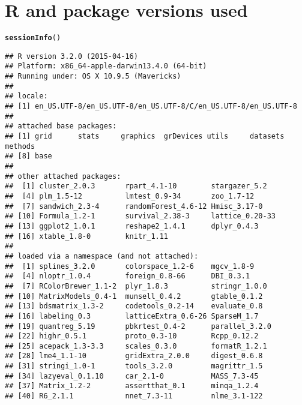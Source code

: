 \documentclass[11pt]{article}\usepackage[]{graphicx}\usepackage[]{color}
\makeatletter
\newcommand{\hlstd}[1]{\textcolor[rgb]{0.345,0.345,0.345}{#1}}%
\newcommand{\hlkwd}[1]{\textcolor[rgb]{0.737,0.353,0.396}{\textbf{#1}}}%
\newenvironment{kframe}{%
 \def\at@end@of@kframe{}%
 \ifinner\ifhmode%
  \def\at@end@of@kframe{\end{minipage}}%
  \begin{minipage}{\columnwidth}%
 \fi\fi%
 \def\FrameCommand##1{\hskip\@totalleftmargin \hskip-\fboxsep
 \colorbox{shadecolor}{##1}\hskip-\fboxsep
     \hskip-\linewidth \hskip-\@totalleftmargin \hskip\columnwidth}%
 \MakeFramed {\advance\hsize-\width
   \@totalleftmargin\z@ \linewidth\hsize
   \@setminipage}}%
 {\par\unskip\endMakeFramed%
 \at@end@of@kframe}
\newenvironment{knitrout}{}{} %
\makeatother
\begin{document}
\clearpage


\section{R and package versions used}
\begin{knitrout}
\color{fgcolor}\begin{kframe}
\begin{alltt}
\hlkwd{sessionInfo}\hlstd{()}
\end{alltt}
\begin{verbatim}
## R version 3.2.0 (2015-04-16)
## Platform: x86_64-apple-darwin13.4.0 (64-bit)
## Running under: OS X 10.9.5 (Mavericks)
## 
## locale:
## [1] en_US.UTF-8/en_US.UTF-8/en_US.UTF-8/C/en_US.UTF-8/en_US.UTF-8
## 
## attached base packages:
## [1] grid      stats     graphics  grDevices utils     datasets  methods  
## [8] base     
## 
## other attached packages:
##  [1] cluster_2.0.3       rpart_4.1-10        stargazer_5.2      
##  [4] plm_1.5-12          lmtest_0.9-34       zoo_1.7-12         
##  [7] sandwich_2.3-4      randomForest_4.6-12 Hmisc_3.17-0       
## [10] Formula_1.2-1       survival_2.38-3     lattice_0.20-33    
## [13] ggplot2_1.0.1       reshape2_1.4.1      dplyr_0.4.3        
## [16] xtable_1.8-0        knitr_1.11         
## 
## loaded via a namespace (and not attached):
##  [1] splines_3.2.0       colorspace_1.2-6    mgcv_1.8-9         
##  [4] nloptr_1.0.4        foreign_0.8-66      DBI_0.3.1          
##  [7] RColorBrewer_1.1-2  plyr_1.8.3          stringr_1.0.0      
## [10] MatrixModels_0.4-1  munsell_0.4.2       gtable_0.1.2       
## [13] bdsmatrix_1.3-2     codetools_0.2-14    evaluate_0.8       
## [16] labeling_0.3        latticeExtra_0.6-26 SparseM_1.7        
## [19] quantreg_5.19       pbkrtest_0.4-2      parallel_3.2.0     
## [22] highr_0.5.1         proto_0.3-10        Rcpp_0.12.2        
## [25] acepack_1.3-3.3     scales_0.3.0        formatR_1.2.1      
## [28] lme4_1.1-10         gridExtra_2.0.0     digest_0.6.8       
## [31] stringi_1.0-1       tools_3.2.0         magrittr_1.5       
## [34] lazyeval_0.1.10     car_2.1-0           MASS_7.3-45        
## [37] Matrix_1.2-2        assertthat_0.1      minqa_1.2.4        
## [40] R6_2.1.1            nnet_7.3-11         nlme_3.1-122
\end{verbatim}
\end{kframe}
\end{knitrout}
\end{document}
